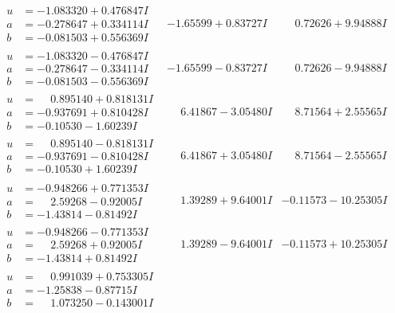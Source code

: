 \documentclass[1p]{elsarticle_modified}
\theoremstyle{definition}
\begin{document}
$$\begin{array}{c|c|c}
\begin{aligned}
u &= -1.083320 + 0.476847 I \\
a &= -0.278647 + 0.334114 I \\
b &= -0.081503 + 0.556369 I\end{aligned}
 & -1.65599 + 0.83727 I & \phantom{-}0.72626 + 9.94888 I \\ \hline\begin{aligned}
u &= -1.083320 - 0.476847 I \\
a &= -0.278647 - 0.334114 I \\
b &= -0.081503 - 0.556369 I\end{aligned}
 & -1.65599 - 0.83727 I & \phantom{-}0.72626 - 9.94888 I \\ \hline\begin{aligned}
u &= \phantom{-}0.895140 + 0.818131 I \\
a &= -0.937691 + 0.810428 I \\
b &= -0.10530 - 1.60239 I\end{aligned}
 & \phantom{-}6.41867 - 3.05480 I & \phantom{-}8.71564 + 2.55565 I \\ \hline\begin{aligned}
u &= \phantom{-}0.895140 - 0.818131 I \\
a &= -0.937691 - 0.810428 I \\
b &= -0.10530 + 1.60239 I\end{aligned}
 & \phantom{-}6.41867 + 3.05480 I & \phantom{-}8.71564 - 2.55565 I \\ \hline\begin{aligned}
u &= -0.948266 + 0.771353 I \\
a &= \phantom{-}2.59268 - 0.92005 I \\
b &= -1.43814 - 0.81492 I\end{aligned}
 & \phantom{-}1.39289 + 9.64001 I & -0.11573 - 10.25305 I \\ \hline\begin{aligned}
u &= -0.948266 - 0.771353 I \\
a &= \phantom{-}2.59268 + 0.92005 I \\
b &= -1.43814 + 0.81492 I\end{aligned}
 & \phantom{-}1.39289 - 9.64001 I & -0.11573 + 10.25305 I \\ \hline\begin{aligned}
u &= \phantom{-}0.991039 + 0.753305 I \\
a &= -1.25838 - 0.87715 I \\
b &= \phantom{-}1.073250 - 0.143001 I\end{aligned}

\end{array}$$
\end{document}
